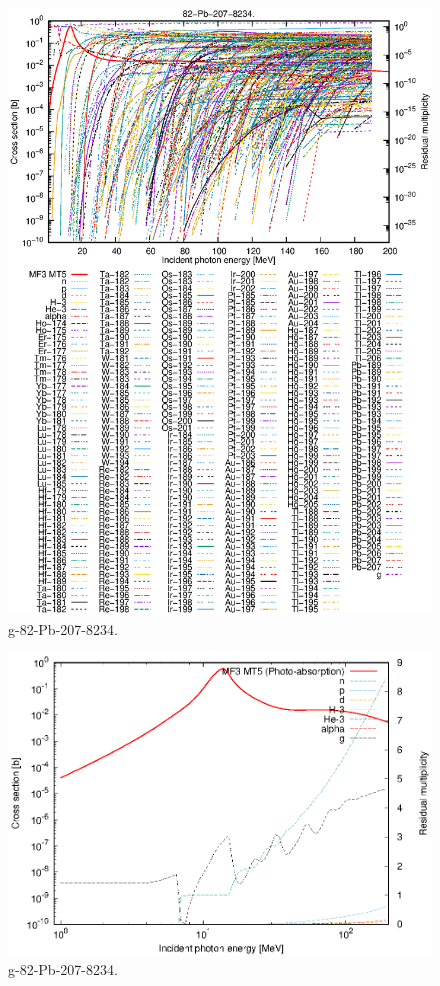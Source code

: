 \begin{figure}
 \includegraphics[width=\linewidth]{eps/g_82-Pb-207_8234.eps}
  \caption{g-82-Pb-207-8234.}
\end{figure}
\newpage \clearpage

\begin{figure}
 \includegraphics[width=\linewidth]{eps-log/g_82-Pb-207_8234.eps}
 \caption{g-82-Pb-207-8234.}
\end{figure}
\newpage \clearpage


